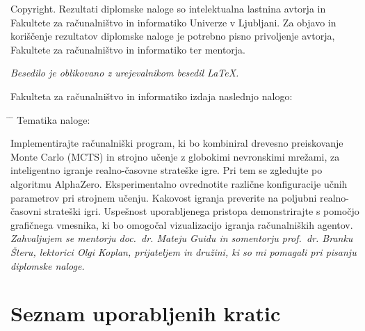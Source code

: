 \documentclass[a4paper, 12pt]{book}
\newcommand{\clearemptydoublepage}{\newpage{\pagestyle{empty}\cleardoublepage}}
\begin{document}
\noindent
{\sc Copyright}. 
Rezultati diplomske naloge so intelektualna lastnina avtorja in Fakultete za računalništvo in informatiko Univerze v Ljubljani.
Za objavo in koriščenje rezultatov diplomske naloge je potrebno pisno privoljenje avtorja, Fakultete za računalništvo in informatiko ter mentorja.

\begin{center}
\mbox{}\vfill
\emph{Besedilo je oblikovano z urejevalnikom besedil \LaTeX.}
\end{center}
\clearemptydoublepage

\thispagestyle{empty}
\vspace*{4cm}

\noindent
Fakulteta za računalništvo in informatiko izdaja naslednjo nalogo:
\medskip
\begin{tabbing}
\hspace{32mm}\= \hspace{6cm} \= \kill
Tematika naloge:
\end{tabbing}
Implementirajte računalniški program, ki bo kombiniral drevesno preiskovanje Monte Carlo (MCTS) in strojno učenje z globokimi nevronskimi mrežami, za inteligentno igranje realno-časovne strateške igre. Pri tem se zgledujte po algoritmu AlphaZero. Eksperimentalno ovrednotite različne konfiguracije učnih parametrov pri strojnem učenju. Kakovost igranja preverite na poljubni realno-časovni strateški igri. Uspešnost uporabljenega pristopa demonstrirajte s pomočjo grafičnega vmesnika, ki bo omogočal vizualizacijo igranja računalniških agentov.
\vspace{15mm}
\vspace{2cm}
\clearemptydoublepage
\thispagestyle{empty}\mbox{}\vfill\null\it%
\noindent
Zahvaljujem se mentorju doc.\ dr. Mateju Guidu in somentorju prof.\ dr. Branku Šteru, lektorici Olgi Koplan, prijateljem in družini, ki so mi pomagali pri pisanju diplomske naloge.
\rm\normalfont
\clearemptydoublepage
\pagestyle{empty}
\def\thepage{}%
\tableofcontents{}
\clearemptydoublepage


\chapter*{Seznam uporabljenih kratic}  %
\end{document}
